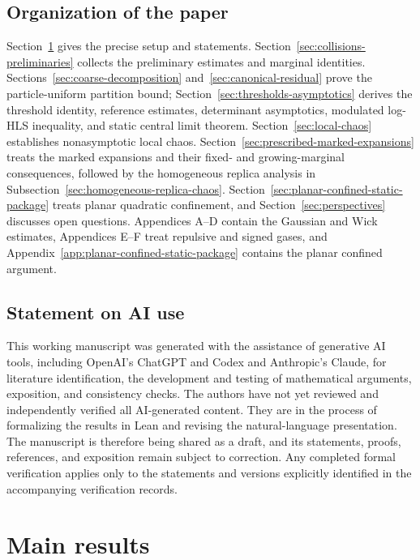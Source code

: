 \documentclass[11pt,reqno]{amsart}
\numberwithin{equation}{section}
\theoremstyle{plain}
\theoremstyle{definition}
\begin{document}
\subsection{Organization of the paper}
\label{subsec:organization}

Section~\ref{sec:main-results} gives the precise setup and statements. Section~\ref{sec:collisions-preliminaries} collects the preliminary estimates and marginal identities. Sections~\ref{sec:coarse-decomposition} and~\ref{sec:canonical-residual} prove the particle-uniform partition bound; Section~\ref{sec:thresholds-asymptotics} derives the threshold identity, reference estimates, determinant asymptotics, modulated log-HLS inequality, and static central limit theorem. Section~\ref{sec:local-chaos} establishes nonasymptotic local chaos. Section~\ref{sec:prescribed-marked-expansions} treats the marked expansions and their fixed- and growing-marginal consequences, followed by the homogeneous replica analysis in Subsection~\ref{sec:homogeneous-replica-chaos}. Section~\ref{sec:planar-confined-static-package} treats planar quadratic confinement, and Section~\ref{sec:perspectives} discusses open questions. Appendices A--D contain the Gaussian and Wick estimates, Appendices E--F treat repulsive and signed gases, and Appendix~\ref{app:planar-confined-static-package} contains the planar confined argument.

\subsection{Statement on AI use}

This working manuscript was generated with the assistance of generative AI tools, including OpenAI's ChatGPT and Codex and Anthropic's Claude, for literature identification, the development and testing of mathematical arguments, exposition, and consistency checks. The authors have not yet reviewed and independently verified all AI-generated content. They are in the process of formalizing the results in Lean and revising the natural-language presentation. The manuscript is therefore being shared as a draft, and its statements, proofs, references, and exposition remain subject to correction. Any completed formal verification applies only to the statements and versions explicitly identified in the accompanying verification records.

\section{Main results}
\label{sec:main-results}
\end{document}
